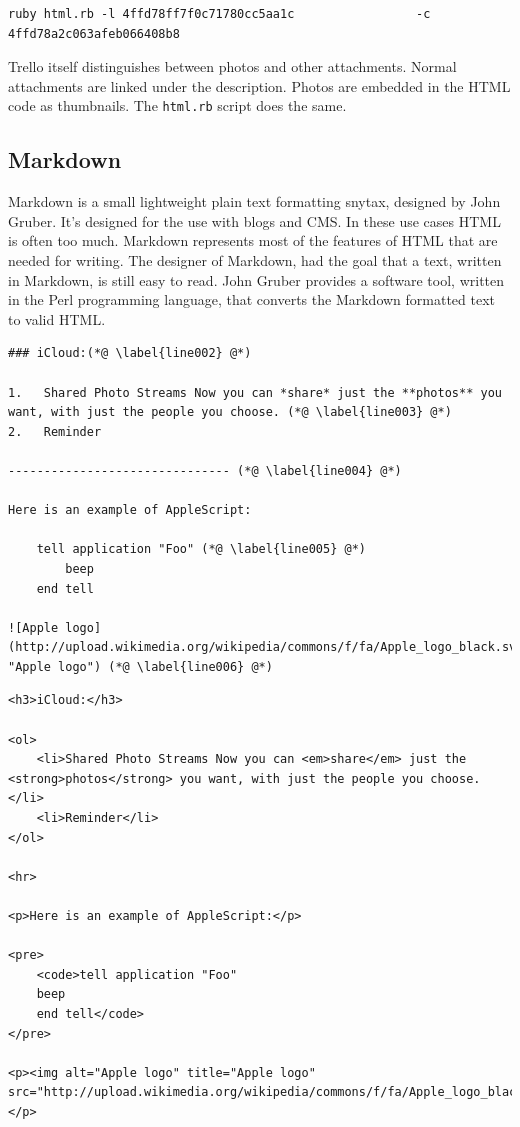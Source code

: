 \begin{lstlisting}[style=bash, float=htb, caption=Example for a \texttt{html.rb} call., label=listing005]
ruby html.rb -l 4ffd78ff7f0c71780cc5aa1c                 -c 4ffd78a2c063afeb066408b8
\end{lstlisting} 

Trello itself distinguishes between photos and other attachments. Normal attachments are linked under the description. Photos are embedded in the HTML code as thumbnails. The \texttt{html.rb} script does the same.

\subsection{Markdown}
Markdown is a small lightweight plain text formatting snytax, designed by John Gruber. It's designed for the use with blogs and CMS. In these use cases HTML is often too much. Markdown represents most of the features of HTML that are needed for writing. The designer of Markdown, had the goal that a text, written in Markdown, is still easy to read. John Gruber provides a software tool, written in the Perl programming language, that converts the Markdown formatted text to valid HTML. \cite{markdown}

\begin{lstlisting}[style=bash, float=htb, caption=Example for a text written in Markdown., label=listing006]
### iCloud:(*@ \label{line002} @*)

1.   Shared Photo Streams Now you can *share* just the **photos** you want, with just the people you choose. (*@ \label{line003} @*)
2.   Reminder

------------------------------- (*@ \label{line004} @*)

Here is an example of AppleScript:

    tell application "Foo" (*@ \label{line005} @*)
        beep
    end tell

![Apple logo](http://upload.wikimedia.org/wikipedia/commons/f/fa/Apple_logo_black.svg "Apple logo") (*@ \label{line006} @*)
\end{lstlisting}


\begin{lstlisting}[style=html, float=htb, caption=Listing \ref{listing006} converted to HTML., label=listing007]
<h3>iCloud:</h3>

<ol>
	<li>Shared Photo Streams Now you can <em>share</em> just the <strong>photos</strong> you want, with just the people you choose.</li>
	<li>Reminder</li>
</ol>

<hr>

<p>Here is an example of AppleScript:</p>

<pre>
	<code>tell application "Foo"
	beep
	end tell</code>
</pre>

<p><img alt="Apple logo" title="Apple logo" src="http://upload.wikimedia.org/wikipedia/commons/f/fa/Apple_logo_black.svg"></p>
\end{lstlisting}

